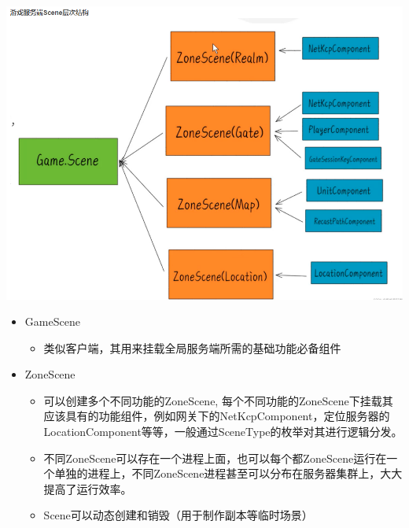 \documentclass[9pt, b5paper]{article}
\begin{document}
\includegraphics[width=.9\linewidth]{./pic/readme_20230201_141859.png}
\begin{itemize}
\item GameScene
\begin{itemize}
\item 类似客户端，其用来挂载全局服务端所需的基础功能必备组件
\end{itemize}
\item ZoneScene
\begin{itemize}
\item 可以创建多个不同功能的ZoneScene, 每个不同功能的ZoneScene下挂载其应该具有的功能组件，例如网关下的NetKcpComponent，定位服务器的LocationComponent等等，一般通过SceneType的枚举对其进行逻辑分发。
\item 不同ZoneScene可以存在一个进程上面，也可以每个都ZoneScene运行在一个单独的进程上，不同ZoneScene进程甚至可以分布在服务器集群上，大大提高了运行效率。
\item Scene可以动态创建和销毁（用于制作副本等临时场景）
\end{itemize}
\end{itemize}
\end{document}
